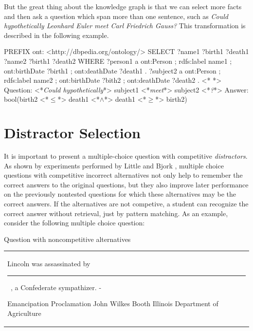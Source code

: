 \documentclass[a4paper, 12pt, twoside]{fithesis2}		%
\renewcommand{\_}{\leavevmode \kern0.07em\vbox{\hrule width0.4em}}
\newcommand{\arrowlinesplit}{%
  \noindent\makebox[\linewidth]{\raisebox{0.15em}{\rule{0.478\textwidth}{0.5pt}}%
  ~$\downarrow$~%
  \noindent\raisebox{0.15em}{\rule{0.478\textwidth}{0.5pt}}}%
}
\newcounter{choice}
\renewcommand\thechoice{\Alph{choice}}
\newcommand\choicelabel{\thechoice.}
\newenvironment{choices}%
  {\vspace{0.8em}\list{\choicelabel}%
     {\usecounter{choice}\def\makelabel##1{\hss\llap{##1}}%
       \settowidth{\leftmargin}{W.\hskip\labelsep\hskip 0.01em}%
       \def\choice{%
         \item
       } %
       \labelwidth\leftmargin\advance\labelwidth-\labelsep
       \topsep=0pt
       \partopsep=0pt
     }%
  }%
  {\vspace{-0.7em}\endlist}
\newenvironment{question}
{
  \begin{center}
  \vspace{-0.5em}
  \begin{tabular}{p{0.9\textwidth}}
}
{
  \\
  \end{tabular}
  \vspace{-1em}
  \end{center}
}
\newcommand{\sentenceGap}{\rule{1.5cm}{0.4pt}~}
\begin{document}
\noindent
But the great thing about the knowledge graph is that we can select more facts and then ask a question which span more than one sentence, such as
\textit{Could hypothetically Leonhard Euler meet Carl Friedrich Gauss?}
This transformation is described in the following example.
\begin{code}
PREFIX ont: <http://dbpedia.org/ontology/>
SELECT ?name1 ?birth1 ?death1 ?name2 ?birth1 ?death2
WHERE {
  ?person1 a ont:Person ;
      rdfs:label name1 ;
      ont:birthDate ?birth1 ;
      ont:deathDate ?death1 .
  ?subject2 a ont:Person ;
      rdfs:label name2 ;
      ont:birthDate ?bith2 ;
      ont:deathDate ?death2 .
}
<*\arrowlinesplit*>
Question: <*\emph{Could hypothetically}*> subject1 <*\emph{meet}*> subject2 <*\emph{?}*>
Answer: bool(birth2 <*$\leq$*> death1 <*$\land$*> death1 <*$\geq$*> birth2)
\end{code}


\section{Distractor Selection}
\label{sec:distractors}

It is important to present a multiple-choice question with competitive \textit{distractors}.
As shown by experiments performed by Little and Bjork \cite{optimizing-multiple-choice}, multiple choice questions with competitive incorrect alternatives not only help to remember the correct answers to the original questions, but they also improve later performance on the previously nontested questions for which these alternatives may be the correct answers. If the alternatives are not competive, a student can recognize the correct answer without retrieval, just by pattern matching. As an example, consider the following multiple choice question:

\begin{exercise}
\caption{Question with noncompetitive alternatives}%
  \begin{question}
  Lincoln was assassinated by \sentenceGap , a Confederate sympathizer.
  \begin{choices}
    \choice Emancipation Proclamation
    \choice John Wilkes Booth
    \choice Illinois
    \choice Department of Agriculture
  \end{choices}
  \end{question}
\end{exercise}
\end{document}
